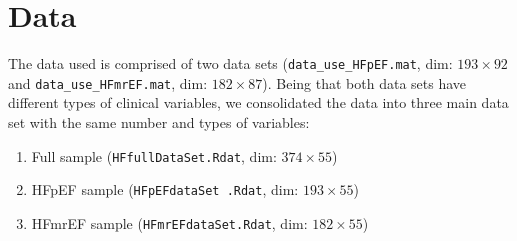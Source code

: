 \documentclass[../thesis.tex]{subfiles}
\begin{document}
\section{Data}
\label{sec:data}

\noindent The data used is comprised of two data sets (\texttt{data\_use\_HFpEF.mat}, dim: $193 \times 92$ and \texttt{data\_use\_HFmrEF.mat}, dim: $182 \times 87$). Being that both data sets have different types of clinical variables, we consolidated the data into three main data set with the same number and types of variables: 
\begin{enumerate}[label=(\roman*)]
    \item Full sample (\texttt{HFfullDataSet.Rdat}, dim: $374 \times 55$)
    \item HFpEF sample (\texttt{HFpEFdataSet .Rdat}, dim: $193 \times 55$)
    \item HFmrEF sample (\texttt{HFmrEFdataSet.Rdat}, dim: $182 \times 55$)
\end{enumerate}
\end{document}
